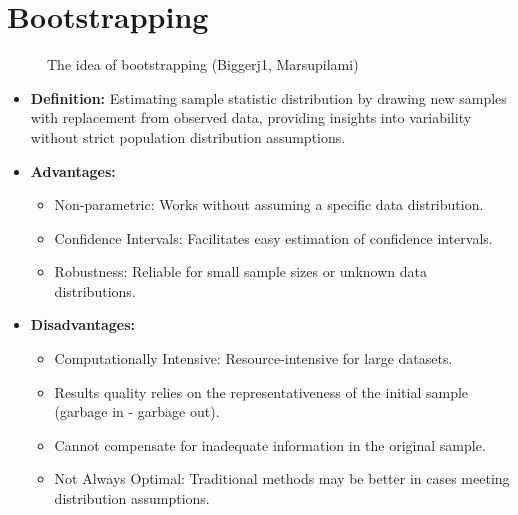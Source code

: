 \documentclass[
  a4paper,
]{scrbook}
\providecommand{\tightlist}{%
  \setlength{\itemsep}{0pt}\setlength{\parskip}{0pt}}\usepackage{longtable,booktabs,array}
\begin{document}
\section{Bootstrapping}\label{bootstrapping}

\begin{figure}[H]


\caption{\label{fig-smpl-btstrp}The idea of bootstrapping (Biggerj1,
Marsupilami)}

\end{figure}%

\begin{itemize}
\item
  \textbf{Definition:} Estimating sample statistic distribution by
  drawing new samples with replacement from observed data, providing
  insights into variability without strict population distribution
  assumptions.
\item
  \textbf{Advantages:}

  \begin{itemize}
  \tightlist
  \item
    Non-parametric: Works without assuming a specific data distribution.
  \item
    Confidence Intervals: Facilitates easy estimation of confidence
    intervals.
  \item
    Robustness: Reliable for small sample sizes or unknown data
    distributions.
  \end{itemize}
\item
  \textbf{Disadvantages:}

  \begin{itemize}
  \tightlist
  \item
    Computationally Intensive: Resource-intensive for large datasets.
  \item
    Results quality relies on the representativeness of the initial
    sample (garbage in - garbage out).
  \item
    Cannot compensate for inadequate information in the original sample.
  \item
    Not Always Optimal: Traditional methods may be better in cases
    meeting distribution assumptions.
  \end{itemize}
\end{itemize}
\end{document}
